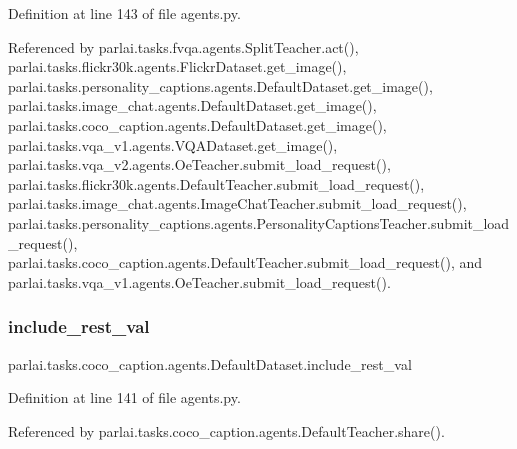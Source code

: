 Definition at line 143 of file agents.\+py.



Referenced by parlai.\+tasks.\+fvqa.\+agents.\+Split\+Teacher.\+act(), parlai.\+tasks.\+flickr30k.\+agents.\+Flickr\+Dataset.\+get\+\_\+image(), parlai.\+tasks.\+personality\+\_\+captions.\+agents.\+Default\+Dataset.\+get\+\_\+image(), parlai.\+tasks.\+image\+\_\+chat.\+agents.\+Default\+Dataset.\+get\+\_\+image(), parlai.\+tasks.\+coco\+\_\+caption.\+agents.\+Default\+Dataset.\+get\+\_\+image(), parlai.\+tasks.\+vqa\+\_\+v1.\+agents.\+V\+Q\+A\+Dataset.\+get\+\_\+image(), parlai.\+tasks.\+vqa\+\_\+v2.\+agents.\+Oe\+Teacher.\+submit\+\_\+load\+\_\+request(), parlai.\+tasks.\+flickr30k.\+agents.\+Default\+Teacher.\+submit\+\_\+load\+\_\+request(), parlai.\+tasks.\+image\+\_\+chat.\+agents.\+Image\+Chat\+Teacher.\+submit\+\_\+load\+\_\+request(), parlai.\+tasks.\+personality\+\_\+captions.\+agents.\+Personality\+Captions\+Teacher.\+submit\+\_\+load\+\_\+request(), parlai.\+tasks.\+coco\+\_\+caption.\+agents.\+Default\+Teacher.\+submit\+\_\+load\+\_\+request(), and parlai.\+tasks.\+vqa\+\_\+v1.\+agents.\+Oe\+Teacher.\+submit\+\_\+load\+\_\+request().

\mbox{\label{classparlai_1_1tasks_1_1coco__caption_1_1agents_1_1DefaultDataset_a2123598b482bd8eabd49d6bdb178c1ed}} 
\subsubsection{\texorpdfstring{include\+\_\+rest\+\_\+val}{include\_rest\_val}}
{\footnotesize\ttfamily parlai.\+tasks.\+coco\+\_\+caption.\+agents.\+Default\+Dataset.\+include\+\_\+rest\+\_\+val}



Definition at line 141 of file agents.\+py.



Referenced by parlai.\+tasks.\+coco\+\_\+caption.\+agents.\+Default\+Teacher.\+share().

\mbox{\label{classparlai_1_1tasks_1_1coco__caption_1_1agents_1_1DefaultDataset_ab44398b6f910aaed1429a8f0ae3791d4}} 
